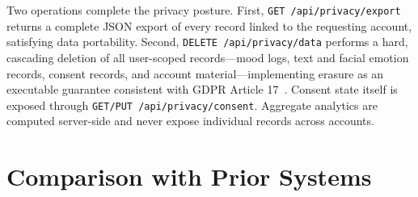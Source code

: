 \documentclass[11pt,a4paper]{article}
\begin{document}
Two operations complete the privacy posture. First, \texttt{GET /api/privacy/export} returns a complete JSON export of every record linked to the requesting account, satisfying data portability. Second, \texttt{DELETE /api/privacy/data} performs a hard, cascading deletion of all user-scoped records---mood logs, text and facial emotion records, consent records, and account material---implementing erasure as an executable guarantee consistent with GDPR Article 17~\cite{gdpr2016}. Consent state itself is exposed through \texttt{GET/PUT /api/privacy/consent}. Aggregate analytics are computed server-side and never expose individual records across accounts.

\section{Comparison with Prior Systems}\label{sec:comparison}
\end{document}
